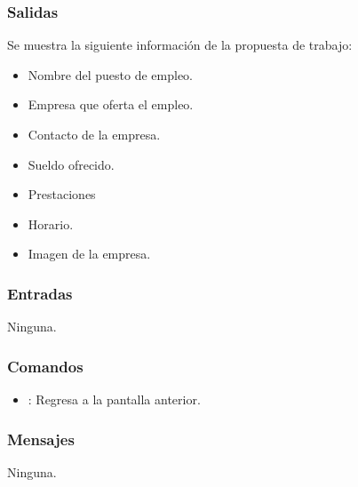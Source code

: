 \subsubsection{Salidas}
	Se muestra la siguiente información de la propuesta de trabajo:
	\begin{itemize}
		\item Nombre del puesto de empleo.
		\item Empresa que oferta el empleo.
		\item Contacto de la empresa.
		\item Sueldo ofrecido.
		\item Prestaciones
		\item Horario.
		\item Imagen de la empresa.
	\end{itemize}

\subsubsection{Entradas}
	\noindent
	Ninguna.

\subsubsection{Comandos}
	\begin{itemize}
		\item {}: Regresa a la pantalla anterior.
	\end{itemize}

\subsubsection{Mensajes}
	\noindent
	Ninguna.
